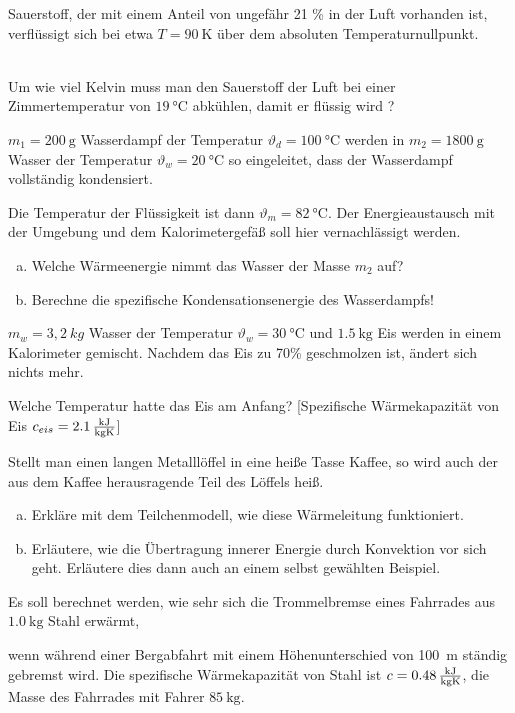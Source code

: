 \documentclass[a4paper]{article}
\begin{document}
\begin{enumerate}[1.]
{\bf \item Sauerstoff, der mit einem Anteil von ungefähr 21 \% in der Luft vorhanden ist, verflüssigt sich bei etwa $ T=\SI{90}{\kelvin}$ über dem absoluten Temperaturnullpunkt.}\\
Um wie viel Kelvin muss man den Sauerstoff der Luft bei einer Zimmertemperatur von
 $\SI{19}{\celsius}$  abkühlen, damit er flüssig wird ? 


{\bf \item $m_1=\SI{200}{\gram}$ Wasserdampf der Temperatur $\vartheta_{d} =\SI{100}{\celsius}$ werden in $m_2=\SI{1800}{\gram}$ Wasser der Temperatur $\vartheta_{w} = \SI{20}{\celsius} $ so eingeleitet, dass der Wasserdampf vollständig kondensiert.} Die Temperatur der Flüssigkeit ist dann 
$\vartheta_{m} = \SI{82}{\celsius} $. Der Energieaustausch mit der Umgebung und dem Kalorimetergefäß soll hier vernachlässigt werden.
\begin{enumerate}[a)]
\item Welche Wärmeenergie nimmt das Wasser der Masse $m_2$ auf?
\item Berechne die spezifische Kondensationsenergie des Wasserdampfs!
\end{enumerate}

{\bf \item $m_w=3,2~kg$ Wasser der Temperatur $\vartheta_w = \SI{30}{\celsius}$ und $\SI{1,5}{\kilogram}$ Eis werden in einem Kalorimeter gemischt. Nachdem das Eis zu 70\% geschmolzen ist, ändert sich nichts mehr.} Welche Temperatur hatte das Eis am Anfang?
[Spezifische Wärmekapazität von Eis  $c_{eis}= \SI{2,1}{\kilo\joule \over \kilogram\kelvin}$]


{\bf \item Stellt man einen langen Metalllöffel in eine heiße Tasse Kaffee, so wird auch der aus dem Kaffee herausragende Teil des Löffels heiß.}
\begin{enumerate}[a)]
\item  Erkläre mit dem Teilchenmodell, wie diese Wärmeleitung funktioniert.
\item Erläutere, wie die Übertragung innerer Energie durch Konvektion vor sich geht. Erläutere dies dann auch an einem selbst gewählten Beispiel.
\end{enumerate}

{\bf \item Es soll berechnet werden, wie sehr sich die Trommelbremse eines Fahrrades aus $\SI{1,0}{\kilogram}$  Stahl erwärmt,} wenn während einer Bergabfahrt mit einem Höhenunterschied von 100~m ständig gebremst wird. Die spezifische Wärmekapazität von Stahl ist $c=\SI{0,48}{\kilo\joule \over \kilogram\kelvin} $, die Masse des Fahrrades mit Fahrer $\SI{85}{\kilogram}$.


\end{enumerate}
\end{document}
